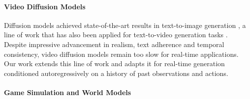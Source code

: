 \documentclass{article} %
\begin{document}
\paragraph{Video Diffusion Models}

Diffusion models achieved state-of-the-art results in text-to-image generation \citep{saharia2022photorealistic, rombach2022high, ramesh2022hierarchical, podell2023sdxl}, a line of work that has also been applied for text-to-video generation tasks \citep{Ho2022ImagenVH, blattmann2023alignlatentshighresolutionvideo, blattmann2023stablevideodiffusionscaling, gupta2023photorealisticvideogenerationdiffusion, girdhar2023emuvideofactorizingtexttovideo, bartal2024lumierespacetimediffusionmodel}. Despite impressive advancement in realism, text adherence and temporal consistency, video diffusion models remain too slow for real-time applications. Our work extends this line of work and adapts it for real-time generation conditioned autoregressively on a history of past observations and actions. 

\paragraph{Game Simulation and World Models}
\end{document}
